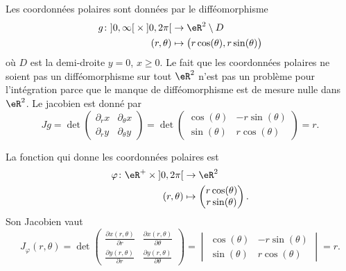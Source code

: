 Les coordonnées polaires sont données par le difféomorphisme
\begin{equation}
	\begin{aligned}
		g\colon \mathopen]0,\infty\mathclose[\times\mathopen]0,2\pi\mathclose[ &\to\eR^2\setminus D\\
		(r,\theta)&\mapsto \big( r\cos(\theta),r\sin(\theta) \big)
	\end{aligned}
\end{equation}
où $D$ est la demi-droite $y=0$, $x\geq 0$. Le fait que les coordonnées polaires ne soient pas un difféomorphisme sur tout $\eR^2$ n'est pas un problème pour l'intégration parce que le manque de difféomorphisme est de mesure nulle dans $\eR^2$. Le jacobien est donné par
\begin{equation}
	Jg=\det\begin{pmatrix}
	\partial_rx	&	\partial_{\theta}x	\\
	\partial_ry	&	\partial_{\theta}y
\end{pmatrix}=\det\begin{pmatrix}
	\cos(\theta)	&	-r\sin(\theta)	\\
	\sin(\theta)	&	r\cos(\theta)
\end{pmatrix}=r.
\end{equation}

La fonction qui donne les coordonnées polaires est
\begin{equation}
    \begin{aligned}
        \varphi\colon \eR^+\times\mathopen] 0 , 2\pi \mathclose[&\to \eR^2 \\
        (r,\theta)&\mapsto\begin{pmatrix}
            r\cos(\theta)    \\
            r\sin(\theta)
        \end{pmatrix}.
    \end{aligned}
\end{equation}
Son Jacobien vaut
\begin{equation}
    J_{\varphi}(r,\theta)=\det\begin{pmatrix}
        \frac{ \partial x(r,\theta) }{ \partial r }    &   \frac{ \partial x(r,\theta) }{ \partial \theta }    \\
        \frac{ \partial y(r,\theta) }{ \partial r }    &   \frac{ \partial y(r,\theta) }{ \partial \theta }
    \end{pmatrix}=
    \begin{vmatrix}
        \cos(\theta)    &   -r\sin(\theta)    \\
        \sin(\theta)    &   r\cos(\theta)
    \end{vmatrix}=r.
\end{equation}

